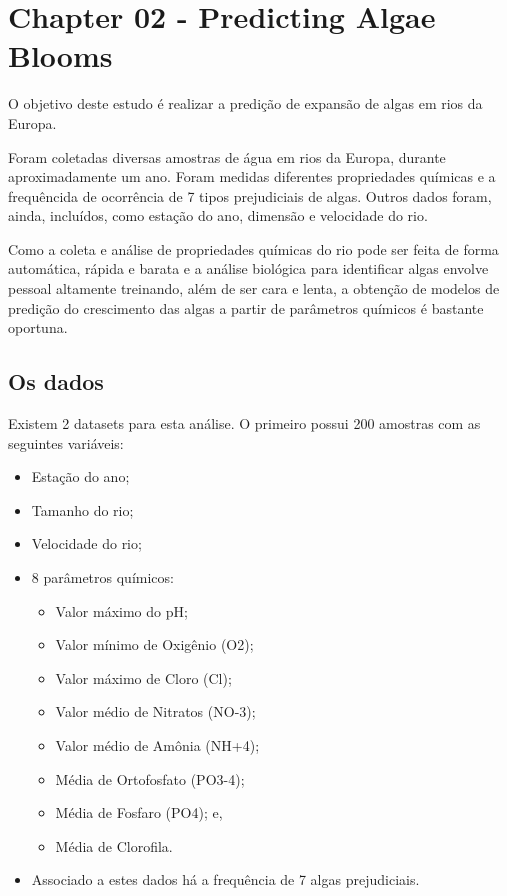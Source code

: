 \documentclass[
]{article}
\author{}
\date{\vspace{-2.5em}}
\providecommand{\tightlist}{%
  \setlength{\itemsep}{0pt}\setlength{\parskip}{0pt}}
\begin{document}
\hypertarget{chapter-02---predicting-algae-blooms}{%
\section{Chapter 02 - Predicting Algae
Blooms}\label{chapter-02---predicting-algae-blooms}}

O objetivo deste estudo é realizar a predição de expansão de algas em
rios da Europa.

Foram coletadas diversas amostras de água em rios da Europa, durante
aproximadamente um ano. Foram medidas diferentes propriedades químicas e
a frequêncida de ocorrência de 7 tipos prejudiciais de algas. Outros
dados foram, ainda, incluídos, como estação do ano, dimensão e
velocidade do rio.

Como a coleta e análise de propriedades químicas do rio pode ser feita
de forma automática, rápida e barata e a análise biológica para
identificar algas envolve pessoal altamente treinando, além de ser cara
e lenta, a obtenção de modelos de predição do crescimento das algas a
partir de parâmetros químicos é bastante oportuna.

\hypertarget{os-dados}{%
\subsection{Os dados}\label{os-dados}}

Existem 2 datasets para esta análise. O primeiro possui 200 amostras com
as seguintes variáveis:

\begin{itemize}
\tightlist
\item
  Estação do ano;
\item
  Tamanho do rio;
\item
  Velocidade do rio;
\item
  8 parâmetros químicos:

  \begin{itemize}
  \tightlist
  \item
    Valor máximo do pH;
  \item
    Valor mínimo de Oxigênio (O2);
  \item
    Valor máximo de Cloro (Cl);
  \item
    Valor médio de Nitratos (NO-3);
  \item
    Valor médio de Amônia (NH+4);
  \item
    Média de Ortofosfato (PO3-4);
  \item
    Média de Fosfaro (PO4); e,
  \item
    Média de Clorofila.
  \end{itemize}
\item
  Associado a estes dados há a frequência de 7 algas prejudiciais.
\end{itemize}
\end{document}
